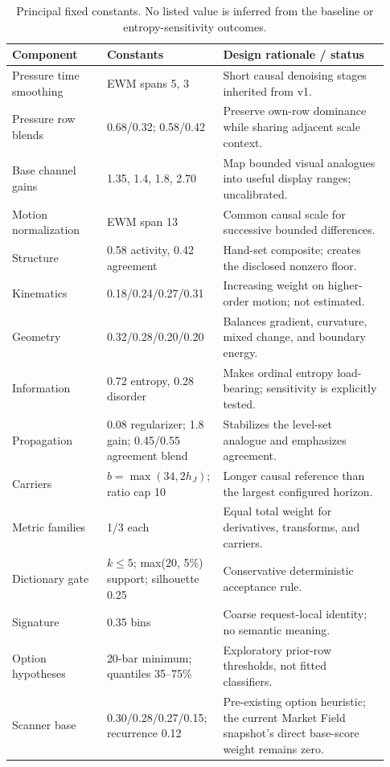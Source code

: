 \documentclass{article}
\begin{document}
\begin{table}[h]
\centering
\footnotesize
\setlength{\tabcolsep}{3pt}
\begin{tabular}{p{0.24\linewidth}p{0.27\linewidth}p{0.42\linewidth}}
\toprule
Component & Constants & Design rationale / status \\
\midrule
Pressure time smoothing & EWM spans 5, 3 & Short causal denoising stages inherited from v1. \\
Pressure row blends & 0.68/0.32; 0.58/0.42 & Preserve own-row dominance while sharing adjacent scale context. \\
Base channel gains & 1.35, 1.4, 1.8, 2.70 & Map bounded visual analogues into useful display ranges; uncalibrated. \\
Motion normalization & EWM span 13 & Common causal scale for successive bounded differences. \\
Structure & 0.58 activity, 0.42 agreement & Hand-set composite; creates the disclosed nonzero floor. \\
Kinematics & 0.18/0.24/0.27/0.31 & Increasing weight on higher-order motion; not estimated. \\
Geometry & 0.32/0.28/0.20/0.20 & Balances gradient, curvature, mixed change, and boundary energy. \\
Information & 0.72 entropy, 0.28 disorder & Makes ordinal entropy load-bearing; sensitivity is explicitly tested. \\
Propagation & 0.08 regularizer; 1.8 gain; 0.45/0.55 agreement blend & Stabilizes the level-set analogue and emphasizes agreement. \\
Carriers & $b=\max(34,2h_J)$; ratio cap 10 & Longer causal reference than the largest configured horizon. \\
Metric families & 1/3 each & Equal total weight for derivatives, transforms, and carriers. \\
Dictionary gate & $k\le5$; max(20, 5\%) support; silhouette 0.25 & Conservative deterministic acceptance rule. \\
Signature & 0.35 bins & Coarse request-local identity; no semantic meaning. \\
Option hypotheses & 20-bar minimum; quantiles 35--75\% & Exploratory prior-row thresholds, not fitted classifiers. \\
Scanner base & 0.30/0.28/0.27/0.15; recurrence 0.12 & Pre-existing option heuristic; the current Market Field snapshot's direct base-score weight remains zero. \\
\bottomrule
\end{tabular}
\caption{Principal fixed constants. No listed value is inferred from the baseline or entropy-sensitivity outcomes.}
\label{tab:constants}
\end{table}
\end{document}

